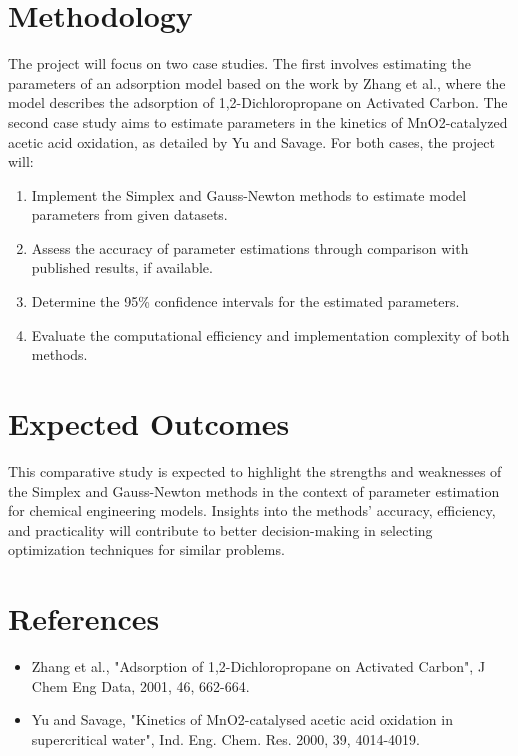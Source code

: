 \documentclass[a4paper,12pt]{article} %
\begin{document}
\section*{Methodology}
The project will focus on two case studies. The first involves estimating the parameters of an adsorption model based on the work by Zhang et al., where the model describes the adsorption of 1,2-Dichloropropane on Activated Carbon. The second case study aims to estimate parameters in the kinetics of MnO2-catalyzed acetic acid oxidation, as detailed by Yu and Savage. For both cases, the project will:
\begin{enumerate}
    \item Implement the Simplex and Gauss-Newton methods to estimate model parameters from given datasets.
    \item Assess the accuracy of parameter estimations through comparison with published results, if available.
    \item Determine the 95\% confidence intervals for the estimated parameters.
    \item Evaluate the computational efficiency and implementation complexity of both methods.
\end{enumerate}

\section*{Expected Outcomes}
This comparative study is expected to highlight the strengths and weaknesses of the Simplex and Gauss-Newton methods in the context of parameter estimation for chemical engineering models. Insights into the methods' accuracy, efficiency, and practicality will contribute to better decision-making in selecting optimization techniques for similar problems.

\section*{References}
\begin{itemize}
    \item Zhang et al., "Adsorption of 1,2-Dichloropropane on Activated Carbon", J Chem Eng Data, 2001, 46, 662-664.
    \item Yu and Savage, "Kinetics of MnO2-catalysed acetic acid oxidation in supercritical water", Ind. Eng. Chem. Res. 2000, 39, 4014-4019.
\end{itemize}
\end{document}
